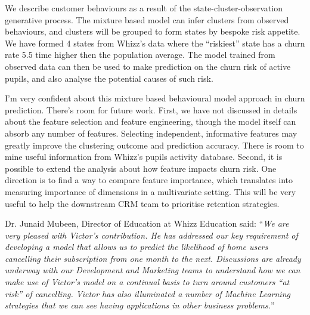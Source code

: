 \documentclass[english,a4,oneside,9pt]{extarticle}
\begin{document}
We describe customer behaviours as a result of the state-cluster-observation generative process. The mixture based model can infer clusters from observed behaviours, and clusters will be grouped to form states by bespoke risk appetite. We have formed 4 states from Whizz's data where the ``riskiest'' state has a churn rate 5.5 time higher then the population average. The model trained from observed data can then be used to make prediction on the churn risk of active pupils, and also analyse the potential causes of such risk.

I'm very confident about this mixture based behavioural model approach in churn prediction. There's room for future work. First, we have not discussed in details about the feature selection and feature engineering, though the model itself can absorb any number of features. Selecting independent, informative features may greatly improve the clustering outcome and prediction accuracy. There is room to mine useful information from Whizz's pupils activity database. Second, it is possible to extend the analysis about how feature impacts churn risk. One direction is to find a way to compare feature importance, which translates into measuring importance of dimensions in a multivariate setting. This will be very useful to help the downstream CRM team to prioritise retention strategies.  

Dr. Junaid Mubeen, Director of Education at Whizz Education said: ``\emph{We are very pleased with Victor's contribution. He has addressed our key requirement of developing a model that allows us to predict the likelihood of home users cancelling their subscription from one month to the next. Discussions are already underway with our Development and Marketing teams to understand how we can make use of Victor's model on a continual basis to turn around customers ``at risk'' of cancelling. Victor has also illuminated a number of Machine Learning strategies that we can see having applications in other business problems.}''


\begin{small}

\end{small}
\end{document}
